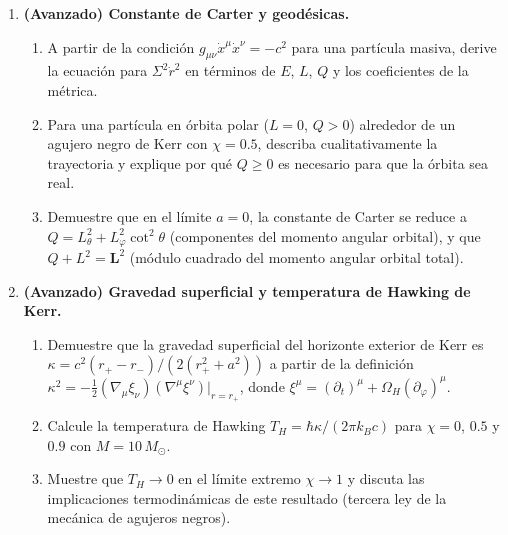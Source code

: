 \begin{enumerate}[leftmargin=2em, label=\textbf{P\thechapter.\arabic*.}]
  \item \textbf{(Avanzado) Constante de Carter y geodésicas.}
  \begin{enumerate}[label=(\alph*)]
    \item A partir de la condición $g_{\mu\nu}\dot{x}^\mu\dot{x}^\nu = -c^2$ para una partícula masiva, derive la ecuación para $\Sigma^2\dot{r}^2$ en términos de $E$, $L$, $Q$ y los coeficientes de la métrica.
    \item Para una partícula en órbita polar ($L = 0$, $Q > 0$) alrededor de un agujero negro de Kerr con $\chi = 0.5$, describa cualitativamente la trayectoria y explique por qué $Q \geq 0$ es necesario para que la órbita sea real.
    \item Demuestre que en el límite $a = 0$, la constante de Carter se reduce a $Q = L_\theta^2 + L_\varphi^2\cot^2\!\theta$ (componentes del momento angular orbital), y que $Q + L^2 = \mathbf{L}^2$ (módulo cuadrado del momento angular orbital total).
  \end{enumerate}

  \item \textbf{(Avanzado) Gravedad superficial y temperatura de Hawking de Kerr.}
  \begin{enumerate}[label=(\alph*)]
    \item Demuestre que la gravedad superficial del horizonte exterior de Kerr es $\kappa = c^2(r_+ - r_-)/(2(r_+^2 + a^2))$ a partir de la definición $\kappa^2 = -\tfrac{1}{2}(\nabla_\mu\xi_\nu)(\nabla^\mu\xi^\nu)|_{r=r_+}$, donde $\xi^\mu = (\partial_t)^\mu + \Omega_H(\partial_\varphi)^\mu$.
    \item Calcule la temperatura de Hawking $T_H = \hbar\kappa/(2\pi k_B c)$ para $\chi = 0$, $0.5$ y $0.9$ con $M = 10\,M_\odot$.
    \item Muestre que $T_H \to 0$ en el límite extremo $\chi \to 1$ y discuta las implicaciones termodinámicas de este resultado (tercera ley de la mecánica de agujeros negros).
  \end{enumerate}

\end{enumerate}
